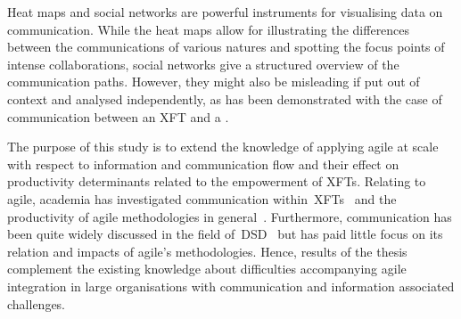 Heat maps and social networks are powerful instruments for visualising data on communication. While the heat maps allow for illustrating the differences between the communications of various natures and spotting the focus points of intense collaborations, social networks give a structured overview of the communication paths. However, they might also be misleading if put out of context and analysed independently, as has been demonstrated with the case of communication between an XFT and a .

The purpose of this study is to extend the knowledge of applying agile at scale with respect to information and communication flow and their effect on productivity determinants related to the empowerment of \acp{XFT}. Relating to agile, academia has investigated communication within~\acp{XFT}~\citep{stray2012investigatingdailyteam, kauffeld2011meetingsmatter, pikkarainen2008impactagilecommunication} and the productivity of agile methodologies in general~\citep{badampudi2013proddelay, leffingwell2007scalelargecorps}. Furthermore, communication has been quite widely discussed in the field of~\ac{DSD}~\citep{curtis1988fieldstudysoftwaredesign, kraut1995coordinationinsd, kraut1995coordinationinsd, rbs2012softwarearchitecture} but has paid little focus on its relation and impacts of agile's methodologies.
Hence, results of the thesis complement the existing knowledge about difficulties accompanying agile integration in large organisations with communication and information associated challenges. 